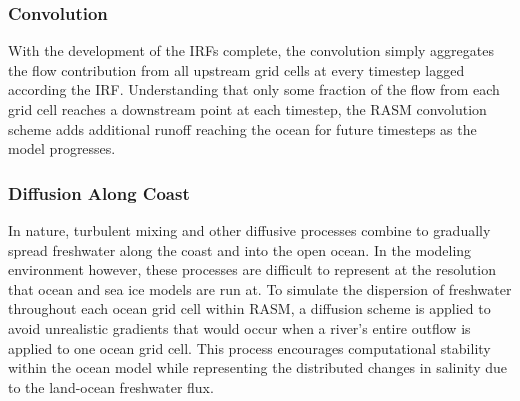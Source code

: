 \subsubsection{Convolution}

With the development of the IRFs complete, the convolution simply aggregates the flow contribution from all upstream grid cells at every timestep lagged according the IRF.  Understanding that only some fraction of the flow from each grid cell reaches a downstream point at each timestep, the RASM convolution scheme adds additional runoff reaching the ocean for future timesteps as the model progresses.

\subsubsection{Diffusion Along Coast}

In nature, turbulent mixing and other diffusive processes combine to gradually spread freshwater along the coast and into the open ocean.  In the modeling environment however, these processes are difficult to represent at the resolution that ocean and sea ice models are run at.  To simulate the dispersion of freshwater throughout each ocean grid cell within RASM, a diffusion scheme is applied to avoid unrealistic gradients that would occur when a river’s entire outflow is applied to one ocean grid cell.  This process encourages computational stability within the ocean model while representing the distributed changes in salinity due to the land-ocean freshwater flux.  
  
  
  
  